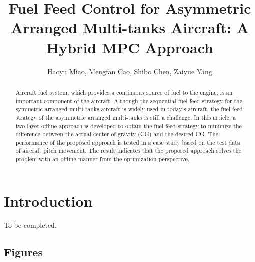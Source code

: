 \documentclass[english]{cccconf}
\begin{document}
\title{Fuel Feed Control for Asymmetric Arranged Multi-tanks Aircraft: A Hybrid MPC Approach}

\author{Haoyu Miao,
        Mengfan Cao,
        Shibo Chen,
        Zaiyue Yang}


\maketitle

\begin{abstract}
Aircraft fuel system, which provides a continuous source of fuel to the engine, is an important component of the aircraft.
Although the sequential fuel feed strategy for the symmetric arranged multi-tanks aircraft is widely used in today's aircraft, the fuel feed strategy of the asymmetric arranged multi-tanks is still a challenge.
In this article, a two layer offline approach is developed to obtain the fuel feed strategy to minimize the difference between the actual center of gravity (CG) and the desired CG.
The performance of the proposed approach is tested in a case study based on the test data of aircraft pitch movement. 
The result indicates that the proposed approach solves the problem with an offline manner from the optimization perspective.

\end{abstract}



\section{Introduction}

To be completed.



\subsection{Figures}
\end{document}
